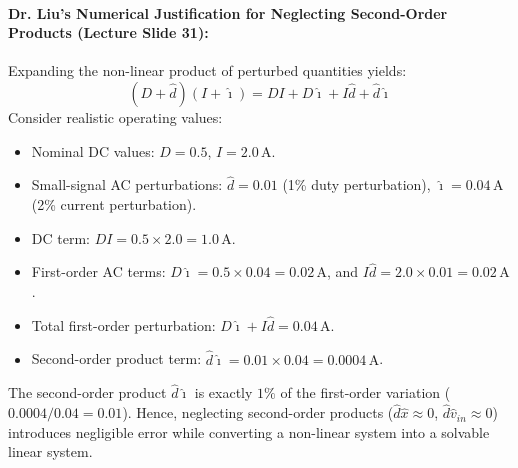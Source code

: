\paragraph{Dr. Liu's Numerical Justification for Neglecting Second-Order Products (Lecture Slide 31):}
Expanding the non-linear product of perturbed quantities yields:
\begin{equation}
(D + \hat{d})(I + \hat{\imath}) = D I + D \hat{\imath} + I \hat{d} + \hat{d} \hat{\imath}
\end{equation}
Consider realistic operating values:
\begin{itemize}
  \item Nominal DC values: $D = 0.5$, $I = 2.0\,\si{\ampere}$.
  \item Small-signal AC perturbations: $\hat{d} = 0.01$ (1\% duty perturbation), $\hat{\imath} = 0.04\,\si{\ampere}$ (2\% current perturbation).
  \item DC term: $D I = 0.5 \times 2.0 = 1.0\,\si{\ampere}$.
  \item First-order AC terms: $D \hat{\imath} = 0.5 \times 0.04 = 0.02\,\si{\ampere}$, and $I \hat{d} = 2.0 \times 0.01 = 0.02\,\si{\ampere}$.
  \item Total first-order perturbation: $D \hat{\imath} + I \hat{d} = 0.04\,\si{\ampere}$.
  \item Second-order product term: $\hat{d} \hat{\imath} = 0.01 \times 0.04 = 0.0004\,\si{\ampere}$.
\end{itemize}
The second-order product $\hat{d}\hat{\imath}$ is exactly $1\%$ of the first-order variation ($0.0004 / 0.04 = 0.01$). Hence, neglecting second-order products ($\hat{d}\hat{x} \approx 0$, $\hat{d}\hat{v}_{in} \approx 0$) introduces negligible error while converting a non-linear system into a solvable linear system.

